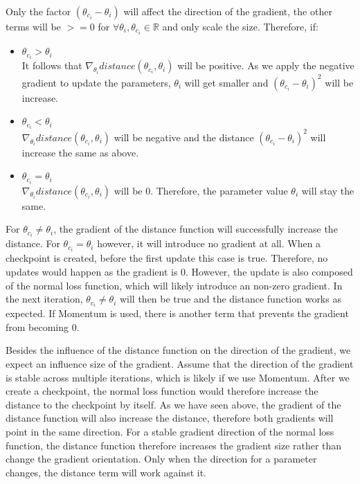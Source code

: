 Only the factor $(\theta_{c_i} - \theta_i)$ will affect the direction of the
gradient, the other terms will be $>=0$ for $\forall \theta_i , \theta_{c_i}\in
\mathbb{R}$ and only scale the size. Therefore, if:
\begin{itemize}
    \item $\theta_{c_i} > \theta_i$\\
        It follows that $\nabla_{\theta_i} distance(\theta_{c_i}, \theta_i)$
        will be positive. As we apply the negative gradient to update the
        parameters, $\theta_i$ will get smaller and  $(\theta_{c_i} - \theta_i)^2$
        will be increase.
    \item $\theta_{c_i} < \theta_i$\\
        $\nabla_{\theta_i} distance(\theta_{c_i}, \theta_i)$ will be negative
        and the distance $(\theta_{c_i} - \theta_i)^2$ will increase the same as
        above.
    \item $\theta_{c_i} = \theta_i$\\
        $\nabla_{\theta_i} distance(\theta_{c_i}, \theta_i)$ will be 0.
        Therefore, the parameter value $\theta_i$ will stay the same.
\end{itemize} 

For $\theta_{c_i} \neq \theta_i$, the gradient of the distance function will
successfully increase the distance. For $\theta_{c_i} = \theta_i$ however, it
will introduce no gradient at all. When a checkpoint is created, before the
first update this case is true. Therefore, no updates would happen as the
gradient is 0. However, the update is also composed of the normal loss function,
which will likely introduce an non-zero gradient. In the next iteration,
$\theta_{c_i} \neq \theta_i$ will then be true and the distance function works
as expected. If Momentum is used, there is another term that prevents the
gradient from becoming 0.


Besides the influence of the distance function on the direction of the gradient,
we expect an influence size of the gradient. Assume that the direction of the
gradient is stable across multiple iterations, which is likely if we use
Momentum. After we create a checkpoint, the normal loss function would therefore
increase the distance to the checkpoint by itself. As we have seen above, the
gradient of the distance function will also increase the distance, therefore
both gradients will point in the same direction. For a stable gradient direction
of the normal loss function, the distance function therefore increases the
gradient size rather than change the gradient orientation. Only when the
direction for a parameter changes, the distance term will work against it.


